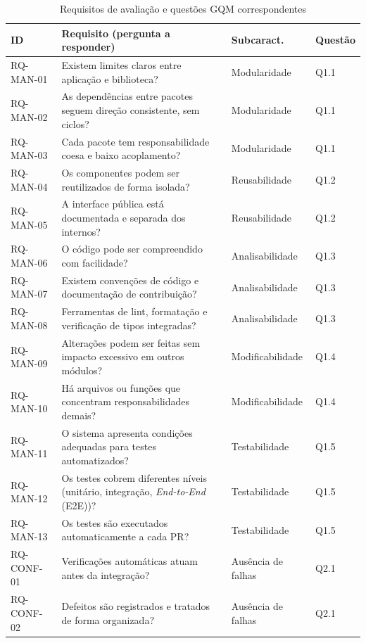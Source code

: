 \documentclass[12pt]{article}
\begin{document}
\begin{table}[!ht]
\centering
\caption{Requisitos de avaliação e questões GQM correspondentes}
\label{tab:requisitos}
\vspace{4pt}
\scriptsize
\setlength{\tabcolsep}{3pt}
\begin{tabular}{p{1.9cm}p{10.0cm}p{2.4cm}p{1.2cm}}
\toprule
\textbf{ID} & \textbf{Requisito (pergunta a responder)} & \textbf{Subcaract.} & \textbf{Questão} \\
\midrule
RQ-MAN-01 & Existem limites claros entre aplicação e biblioteca? & Modularidade & Q1.1 \\
RQ-MAN-02 & As dependências entre pacotes seguem direção consistente, sem ciclos? & Modularidade & Q1.1 \\
RQ-MAN-03 & Cada pacote tem responsabilidade coesa e baixo acoplamento? & Modularidade & Q1.1 \\
RQ-MAN-04 & Os componentes podem ser reutilizados de forma isolada? & Reusabilidade & Q1.2 \\
RQ-MAN-05 & A interface pública está documentada e separada dos internos? & Reusabilidade & Q1.2 \\
RQ-MAN-06 & O código pode ser compreendido com facilidade? & Analisabilidade & Q1.3 \\
RQ-MAN-07 & Existem convenções de código e documentação de contribuição? & Analisabilidade & Q1.3 \\
RQ-MAN-08 & Ferramentas de lint, formatação e verificação de tipos integradas? & Analisabilidade & Q1.3 \\
RQ-MAN-09 & Alterações podem ser feitas sem impacto excessivo em outros módulos? & Modificabilidade & Q1.4 \\
RQ-MAN-10 & Há arquivos ou funções que concentram responsabilidades demais? & Modificabilidade & Q1.4 \\
RQ-MAN-11 & O sistema apresenta condições adequadas para testes automatizados? & Testabilidade & Q1.5 \\
RQ-MAN-12 & Os testes cobrem diferentes níveis (unitário, integração, \textit{End-to-End} (E2E))? & Testabilidade & Q1.5 \\
RQ-MAN-13 & Os testes são executados automaticamente a cada PR? & Testabilidade & Q1.5 \\
\midrule
RQ-CONF-01 & Verificações automáticas atuam antes da integração? & Ausência de falhas & Q2.1 \\
RQ-CONF-02 & Defeitos são registrados e tratados de forma organizada? & Ausência de falhas & Q2.1 \\

\end{tabular}
\end{table}
\end{document}
